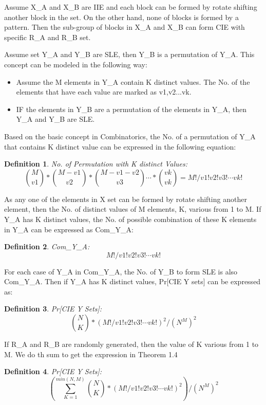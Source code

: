 \documentclass{article}
\newtheorem{defination}{Definition}[section]
\begin{document}
Assume X\_A and X\_B are IIE and each block can be formed by rotate shifting another block in the set. On the other hand, none of blocks is formed by a pattern. Then the sub-group of blocks in X\_A and X\_B can form CIE with specific R\_A and R\_B set. 

Assume set Y\_A and Y\_B are SLE, then Y\_B is a permutation of Y\_A. This concept can be modeled in the following way:
\begin{itemize}
	\item Assume the M elements in Y\_A contain K distinct values. The No. of the elements that have each value are marked as v1,v2...vk.
	\item IF the elements in Y\_B are a permutation of the elements in Y\_A, then Y\_A and Y\_B are SLE.
\end{itemize}

Based on the basic concept in Combinatorics, the No. of a permutation of Y\_A that contains K distinct value can be expressed in the following equation:
\begin{defination}
No. of Permutation with K distinct Values:
\begin{displaymath}
\binom{M}{v1} * \binom{M-v1}{v2} * \binom{M-v1-v2}{v3} \cdots * \binom{vk}{vk} = M!/v1!v2!v3! \cdots vk!
\end{displaymath}
\end{defination}
As any one of the elements in X set can be formed by rotate shifting another element, then the No. of distinct values of M elements, K, various from 1 to M. If Y\_A has K distinct values, the No. of possible combination of these K elements in Y\_A can be expressed as Com\_Y\_A:
\begin{defination}
Com\_Y\_A:
\begin{displaymath}
M!/v1!v2!v3! \cdots vk!
\end{displaymath} 
\end{defination} 

For each case of Y\_A in Com\_Y\_A, the No. of Y\_B to form SLE is also Com\_Y\_A. Then if Y\_A has K distinct values, Pr[CIE Y sets] can be expressed as:
\begin{defination}
Pr[CIE Y Sets]:
\begin{displaymath}
 \binom{N}{K} * (M!/v1!v2!v3! \cdots vk!) ^ 2 /(N^M)^2
\end{displaymath}
\end{defination}
If R\_A and R\_B are randomly generated, then the value of K various from 1 to M. We do th sum to get the expression in Theorem 1.4
\begin{defination}
Pr[CIE Y Sets]:
\begin{displaymath}
(\sum_{K=1}^{min(N,M)} \binom{N}{K} * (M!/v1!v2!v3! \cdots vk!) ^ 2 )/(N^M)^2
\end{displaymath}
\end{defination}
\end{document}
